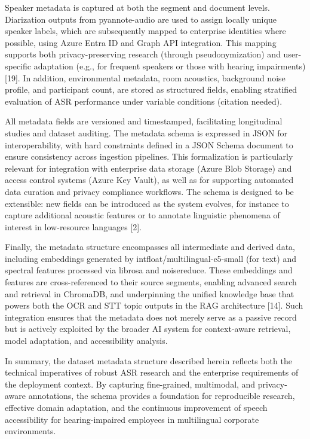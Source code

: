 \documentclass[12pt,a4paper]{article}
\begin{document}
Speaker metadata is captured at both the segment and document levels. Diarization outputs from pyannote-audio are used to assign locally unique speaker labels, which are subsequently mapped to enterprise identities where possible, using Azure Entra ID and Graph API integration. This mapping supports both privacy-preserving research (through pseudonymization) and user-specific adaptation (e.g., for frequent speakers or those with hearing impairments) [19]. In addition, environmental metadata, room acoustics, background noise profile, and participant count, are stored as structured fields, enabling stratified evaluation of ASR performance under variable conditions (citation needed).


All metadata fields are versioned and timestamped, facilitating longitudinal studies and dataset auditing. The metadata schema is expressed in JSON for interoperability, with hard constraints defined in a JSON Schema document to ensure consistency across ingestion pipelines. This formalization is particularly relevant for integration with enterprise data storage (Azure Blob Storage) and access control systems (Azure Key Vault), as well as for supporting automated data curation and privacy compliance workflows. The schema is designed to be extensible: new fields can be introduced as the system evolves, for instance to capture additional acoustic features or to annotate linguistic phenomena of interest in low-resource languages [2].


Finally, the metadata structure encompasses all intermediate and derived data, including embeddings generated by intfloat/multilingual-e5-small (for text) and spectral features processed via librosa and noisereduce. These embeddings and features are cross-referenced to their source segments, enabling advanced search and retrieval in ChromaDB, and underpinning the unified knowledge base that powers both the OCR and STT topic outputs in the RAG architecture [14]. Such integration ensures that the metadata does not merely serve as a passive record but is actively exploited by the broader AI system for context-aware retrieval, model adaptation, and accessibility analysis.


In summary, the dataset metadata structure described herein reflects both the technical imperatives of robust ASR research and the enterprise requirements of the deployment context. By capturing fine-grained, multimodal, and privacy-aware annotations, the schema provides a foundation for reproducible research, effective domain adaptation, and the continuous improvement of speech accessibility for hearing-impaired employees in multilingual corporate environments.
\end{document}
